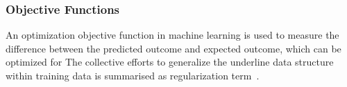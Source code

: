\subsubsection{Objective Functions}
An optimization objective function in machine learning is used to measure the difference between the predicted outcome and expected outcome, which can be optimized for  The collective efforts to generalize the underline data structure within training data is summarised as regularization term~\cite{goodfellow_2015}.  
